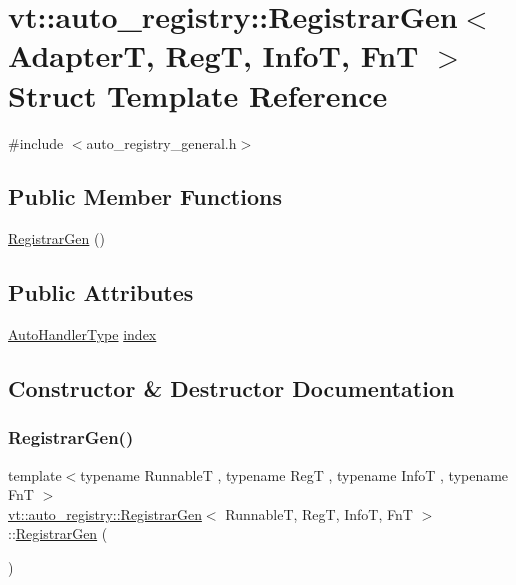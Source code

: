 \hypertarget{structvt_1_1auto__registry_1_1_registrar_gen}{}\section{vt\+:\+:auto\+\_\+registry\+:\+:Registrar\+Gen$<$ AdapterT, RegT, InfoT, FnT $>$ Struct Template Reference}
\label{structvt_1_1auto__registry_1_1_registrar_gen}


{\ttfamily \#include $<$auto\+\_\+registry\+\_\+general.\+h$>$}

\subsection*{Public Member Functions}
\begin{DoxyCompactItemize}
\item 
\hyperlink{structvt_1_1auto__registry_1_1_registrar_gen_add3d9dcde6caae494624a8b231357dc0}{Registrar\+Gen} ()
\end{DoxyCompactItemize}
\subsection*{Public Attributes}
\begin{DoxyCompactItemize}
\item 
\hyperlink{namespacevt_1_1auto__registry_ae295e18699146815bb7d7674594d95d7}{Auto\+Handler\+Type} \hyperlink{structvt_1_1auto__registry_1_1_registrar_gen_aea0ee7667b56a5bc4541da4ae3d653ea}{index}
\end{DoxyCompactItemize}


\subsection{Constructor \& Destructor Documentation}
\mbox{\label{structvt_1_1auto__registry_1_1_registrar_gen_add3d9dcde6caae494624a8b231357dc0}} 
\subsubsection{\texorpdfstring{Registrar\+Gen()}{RegistrarGen()}}
{\footnotesize\ttfamily template$<$typename RunnableT , typename RegT , typename InfoT , typename FnT $>$ \\
\hyperlink{structvt_1_1auto__registry_1_1_registrar_gen}{vt\+::auto\+\_\+registry\+::\+Registrar\+Gen}$<$ RunnableT, RegT, InfoT, FnT $>$\+::\hyperlink{structvt_1_1auto__registry_1_1_registrar_gen}{Registrar\+Gen} (\begin{DoxyParamCaption}{ }\end{DoxyParamCaption})}



